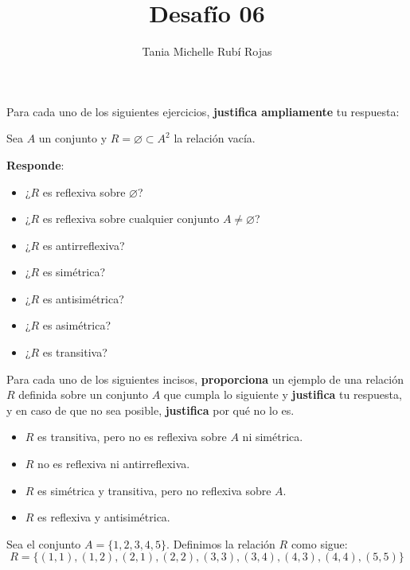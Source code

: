 \documentclass[oneside]{style}
\title{Desafío 06}
\author{Tania Michelle Rubí Rojas}
\begin{document}
\maketitle

Para cada uno de los siguientes ejercicios, \textbf{justifica ampliamente} tu 
respuesta:

\begin{questions}[label=\protect\circled{\bfseries\arabic*}]
    \question
    {
        Sea $A$ un conjunto y $R = \varnothing \subset A^2$ la 
        relación vacía. 

        \textbf{Responde}:
        \begin{itemize}
            \item ¿$R$ es reflexiva sobre $\varnothing$?
            \item ¿$R$ es reflexiva sobre cualquier conjunto $A \neq 
            \varnothing$? 
            \item ¿$R$ es antirreflexiva?
            \item ¿$R$ es simétrica?
            \item ¿$R$ es antisimétrica?
            \item ¿$R$ es asimétrica?
            \item ¿$R$ es transitiva?
        \end{itemize}
    }

    \question
    {
        Para cada uno de los siguientes incisos, \textbf{proporciona} un ejemplo 
        de una relación $R$ definida sobre un conjunto $A$ que cumpla lo 
        siguiente y \textbf{justifica} tu respuesta, y en caso de que no sea 
        posible, \textbf{justifica} por qué no lo es. 
        \begin{itemize}
            \item $R$ es transitiva, pero no es reflexiva sobre $A$ ni simétrica.
            \item $R$ no es reflexiva ni antirreflexiva.
            \item $R$ es simétrica y transitiva, pero no reflexiva sobre $A$.
            \item $R$ es reflexiva y antisimétrica.
        \end{itemize}
    }

    \question
    {
        Sea el conjunto $A = \{1,2,3,4,5\}$. Definimos la relación $R$ como 
        sigue: 
        \begin{equation*}
            R = \{(1,1), (1,2), (2,1), (2,2), (3,3), (3,4), (4,3), (4,4), (5,5)\}
        \end{equation*}

}
\end{questions}
\end{document}
